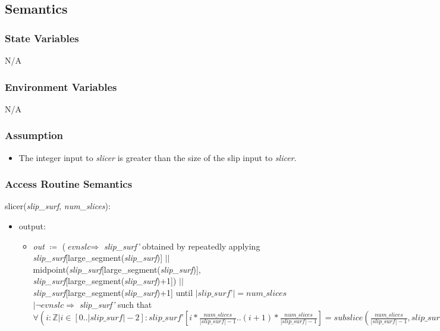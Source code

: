 \documentclass[12pt, titlepage]{article}
\begin{document}
\subsection{Semantics}

\subsubsection{State Variables}
N/A

\subsubsection{Environment Variables}
N/A

\subsubsection{Assumption}
\begin{itemize}
	\item The integer input to \textit{slicer} is greater than the size of the 
	slip input to \textit{slicer}.
\end{itemize}

\subsubsection{Access Routine Semantics}
slicer(\textit{slip\_surf}, \textit{num\_slices}):
\begin{itemize}
	\item output:
	\begin{itemize}
		\item[] \textit{out} $\coloneqq$ ($\textit{evnslc} \Rightarrow$ 
		\textit{slip\_surf'} obtained by repeatedly applying 
		\textit{slip\_surf}[large\_segment(\textit{slip\_surf})] $||$ 
		midpoint(\textit{slip\_surf}[large\_segment(\textit{slip\_surf})], 
		\textit{slip\_surf}[large\_segment(\textit{slip\_surf})+1])
		$||$ \textit{slip\_surf}[large\_segment(\textit{slip\_surf})+1] until 
		$|\textit{slip\_surf'}| = \textit{num\_slices}$ \\
		$| \lnot \textit{evnslc} \Rightarrow$ \textit{slip\_surf'} such that 
		$\forall(i : \mathbb{Z} | i \in [0..|\textit{slip\_surf}|-2] : 
		\textit{slip\_surf'}[i*\frac{\textit{num\_slices}}
		{|\textit{slip\_surf}|-1}..(i+1)*\frac{\textit{num\_slices}}
		{|\textit{slip\_surf}|-1}] = subslice(\frac{\textit{num\_slices}}
		{|\textit{slip\_surf}|-1}, \textit{slip\_surf}[i], 
		\textit{slip\_surf}[i+1]))$
	\end{itemize}
\end{itemize}
\end{document}
